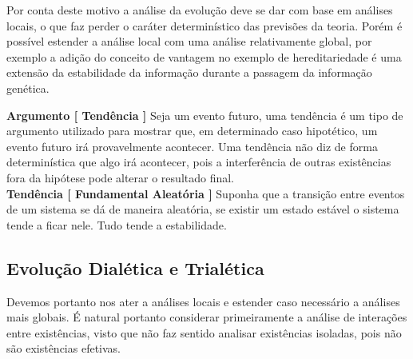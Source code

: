 \documentclass[10pt,a4paper]{report}
\begin{document}
Por conta deste motivo a análise da evolução deve se dar com base em análises locais, o que faz perder o caráter determinístico das previsões da teoria. Porém é possível estender a análise local com uma análise relativamente global, por exemplo a adição do conceito de vantagem no exemplo de hereditariedade é uma extensão da estabilidade da informação durante a passagem da informação genética.



\hspace{\baselineskip}

\textbf{Argumento [ Tendência ]} Seja um evento futuro, uma tendência é um tipo de argumento utilizado para mostrar que, em determinado caso hipotético, um evento futuro irá provavelmente acontecer. Uma tendência não diz de forma determinística que algo irá acontecer, pois a interferência de outras existências fora da hipótese pode alterar o resultado final.\\

\textbf{Tendência [ Fundamental Aleatória ]} Suponha que a transição entre eventos de um sistema se dá de maneira aleatória, se existir um estado estável o sistema tende a ficar nele. Tudo tende a estabilidade.


\subsection{Evolução Dialética e Trialética}

\hspace{\baselineskip}


Devemos portanto nos ater a análises locais e estender caso necessário a análises mais globais. É natural portanto considerar primeiramente a análise de interações entre existências, visto que não faz sentido analisar existências isoladas, pois não são existências efetivas.
\end{document}
